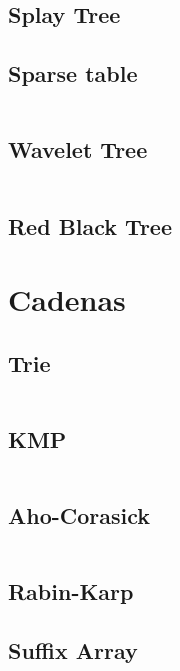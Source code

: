 \documentclass[11pt]{article}
\begin{document}
		\subsection{Splay Tree}
		
		
		\subsection{Sparse table}
		\inputminted[tabsize=2,breaklines,firstline=565,lastline=600,fontsize=\small]{c++}{queries.cpp}
		
		\subsection{Wavelet Tree}
		\inputminted[tabsize=2,breaklines,firstline=602,lastline=665,fontsize=\small]{c++}{queries.cpp}
		
		\subsection{Red Black Tree}
		
		
	\newpage
	\section{Cadenas}
		\subsection{Trie}
		\inputminted[tabsize=2,breaklines,firstline=144,lastline=196,fontsize=\small]{c++}{strings.cpp}
		
		\subsection{KMP}
		\inputminted[tabsize=2,breaklines,firstline=4,lastline=39,fontsize=\small]{c++}{strings.cpp}
		
		\subsection{Aho-Corasick}
		\inputminted[tabsize=2,breaklines,firstline=41,lastline=142,fontsize=\small]{c++}{strings.cpp}
		
		\subsection{Rabin-Karp}
		
		
		\subsection{Suffix Array}
		
\end{document}
